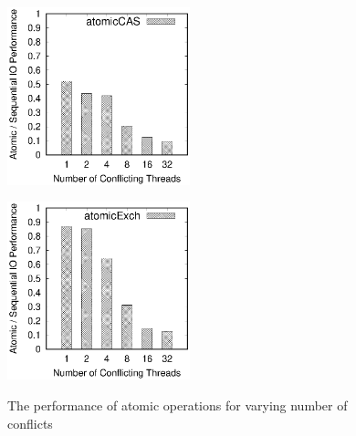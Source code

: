 \begin{figure}[t]
	\hspace{-3em}
	\begin{minipage}{0.5\linewidth}
		\label{fig:atomicCAS}
		\includegraphics[width=5.3cm]{exp/atomic/atomicCAS.eps}
	\end{minipage}
	\hspace{-1em}
	\begin{minipage}{0.5\linewidth}
		\label{fig:atomicExch}
		\includegraphics[width=5.3cm]{exp/atomic/atomicExch.eps}
	\end{minipage}
	\caption{The performance of atomic operations for varying number of conflicts}
	\label{fig:atomic}
\end{figure}

